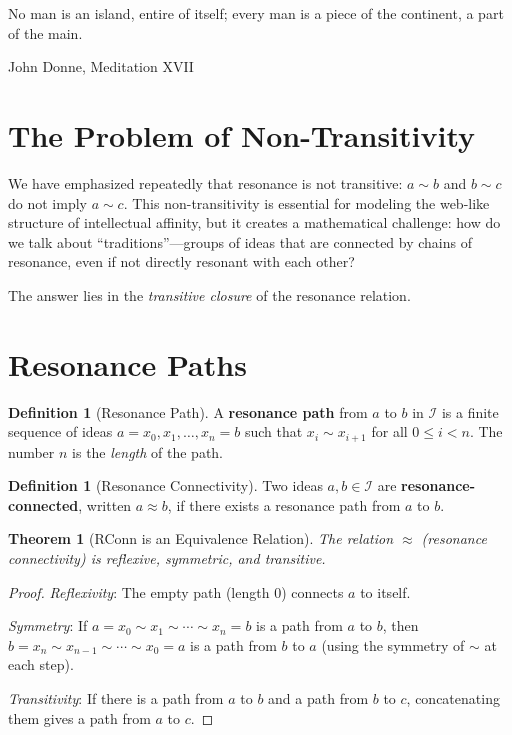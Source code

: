 \documentclass[11pt,openany]{book}
\theoremstyle{definition}
\newtheorem{definition}[axiom]{Definition}
\theoremstyle{plain}
\newtheorem{theorem}[axiom]{Theorem}
\theoremstyle{remark}
\newcommand{\IS}{\mathcal{I}}               %
\newcommand{\res}{\sim}                      %
\begin{document}
\epigraph{No man is an island, entire of itself; every man is a piece of the continent, a part of the main.}{John Donne, Meditation XVII}

\section{The Problem of Non-Transitivity}

We have emphasized repeatedly that resonance is not transitive: $a \res b$ and $b \res c$ do not imply $a \res c$. This non-transitivity is essential for modeling the web-like structure of intellectual affinity, but it creates a mathematical challenge: how do we talk about ``traditions''---groups of ideas that are connected by chains of resonance, even if not directly resonant with each other?

The answer lies in the \emph{transitive closure} of the resonance relation.

\section{Resonance Paths}

\begin{definition}[Resonance Path]
A \textbf{resonance path} from $a$ to $b$ in $\IS$ is a finite sequence of ideas $a = x_0, x_1, \ldots, x_n = b$ such that $x_i \res x_{i+1}$ for all $0 \leq i < n$. The number $n$ is the \emph{length} of the path.
\end{definition}

\begin{definition}[Resonance Connectivity]
Two ideas $a, b \in \IS$ are \textbf{resonance-connected}, written $a \approx b$, if there exists a resonance path from $a$ to $b$.
\end{definition}

\begin{theorem}[RConn is an Equivalence Relation]
The relation $\approx$ (resonance connectivity) is reflexive, symmetric, and transitive.
\end{theorem}

\begin{proof}
\emph{Reflexivity}: The empty path (length 0) connects $a$ to itself.

\emph{Symmetry}: If $a = x_0 \res x_1 \res \cdots \res x_n = b$ is a path from $a$ to $b$, then $b = x_n \res x_{n-1} \res \cdots \res x_0 = a$ is a path from $b$ to $a$ (using the symmetry of $\res$ at each step).

\emph{Transitivity}: If there is a path from $a$ to $b$ and a path from $b$ to $c$, concatenating them gives a path from $a$ to $c$.
\end{proof}
\end{document}
